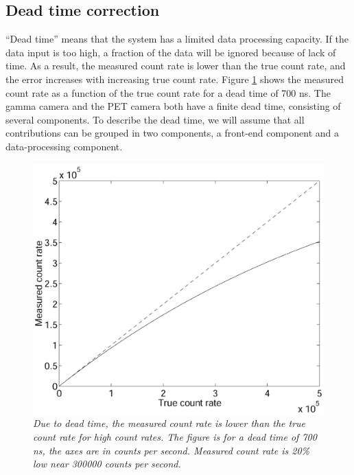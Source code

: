 \subsection{Dead time correction} \label{sec:deadtime}
``Dead time'' means that the system has a limited data processing capacity. If
the data input is too high, a fraction of the data will be ignored because of
lack of time. As a result, the measured count rate is lower than the true
count rate, and the error increases with increasing true count rate. Figure
\ref{fig:dead_time} shows the measured count rate as a function of the true
count rate for a dead time of 700 ns. The gamma camera and the PET camera both
have a finite dead time, consisting of several components. To describe the
dead time, we will assume that all contributions can be grouped in two
components, a front-end component and a data-processing component.

\begin{figure}[tb]
\centering
\includegraphics[width=\figone]{figs/fig_dead_time.pdf}
\caption{\label{fig:dead_time} \emph{Due to dead time, the measured count rate
is lower than the true count rate for high count rates. The figure is for a
dead time of 700 ns, the axes are in counts per second. Measured count rate is
20\% low near 300000 counts per second.}}
\end{figure}

